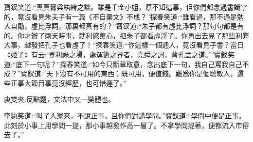 \begin{parag}
    寶釵笑道:“真真膏粱紈絝之談。雖是千金小姐，原不知這事，但你們都念過書識字的，竟沒看見朱夫子有一篇《不自棄文》不成？”探春笑道:“雖看過，那不過是勉人自勵，虛比浮詞，那裏都真有的？”寶釵道:“朱子都有虛比浮詞？那句句都是有的。你才辦了兩天時事，就利慾薰心，把朱子都看虛浮了。你再出去見了那些利弊大事，越發把孔子也看虛了！”探春笑道:“你這樣一個通人，竟沒看見子書？當日《姬子》有云:‘登利祿之場，處運籌之界者，堯舜之詞，背孔孟之道。’”寶釵笑道:“底下一句呢？”探春笑道:“如今只斷章取意，念出底下一句，我自己罵我自己不成？”寶釵道:“天下沒有不可用的東西；既可用，便值錢。難爲你是個聰敏人，這些正事大節目事竟沒經歷，也可惜遲了。”\begin{note}庚雙夾:反點題，文法中又一變體也。\end{note}李紈笑道:“叫了人家來，不說正事，且你們對講學問。”寶釵道:“學問中便是正事。此刻於小事上用學問一提，那小事越發作高一層了。不拿學問提著，便都流入市俗去了。”
\end{parag}


